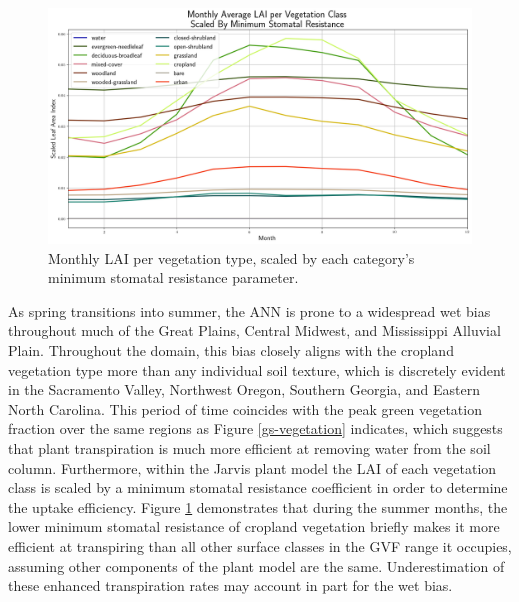 \begin{figure}[h!]
    \centering

    \includegraphics[width=.99\linewidth,draft=false]{figures/gvf/lai-scaled_monthly_stats.png}

    \caption{Monthly LAI per vegetation type, scaled by each category's minimum stomatal resistance parameter.}
    \label{veg-lai-scaled}
\end{figure}

As spring transitions into summer, the ANN is prone to a widespread wet bias throughout much of the Great Plains, Central Midwest, and Mississippi Alluvial Plain. Throughout the domain, this bias closely aligns with the cropland vegetation type more than any individual soil texture, which is discretely evident in the Sacramento Valley, Northwest Oregon, Southern Georgia, and Eastern North Carolina. This period of time coincides with the peak green vegetation fraction over the same regions as Figure \ref{gs-vegetation} indicates, which suggests that plant transpiration is much more efficient at removing water from the soil column. Furthermore, within the Jarvis plant model the LAI of each vegetation class is scaled by a minimum stomatal resistance coefficient in order to determine the uptake efficiency. Figure \ref{veg-lai-scaled} demonstrates that during the summer months, the lower minimum stomatal resistance of cropland vegetation briefly makes it more efficient at transpiring than all other surface classes in the GVF range it occupies, assuming other components of the plant model are the same. Underestimation of these enhanced transpiration rates may account in part for the wet bias.

